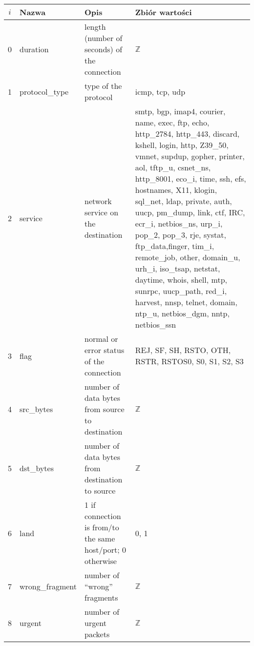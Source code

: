 \documentclass[a4paper, 12pt]{article}
\begin{document}
\begin{tabular}{ | c | p{3cm} | p{3cm} | p{6cm} | } \hline
$i$ & Nazwa & Opis & Zbiór wartości \\ \hline
0      & duration & length (number of seconds) of the connection & $\mathbb{Z}$ \\ \hline
1      & protocol\_type & type of the protocol & icmp, tcp, udp \\ \hline
2      & service & network service on the destination & smtp, bgp, imap4, courier, name, exec, ftp, echo, http\_2784,
                       http\_443, discard, kshell, login, http, Z39\_50, vmnet, supdup,
                       gopher, printer, aol, tftp\_u, csnet\_ns, http\_8001, eco\_i, time,
                       ssh, efs, hostnames, X11, klogin, sql\_net, ldap, private,
                       auth, uucp, pm\_dump, link, ctf, IRC, ecr\_i, netbios\_ns, urp\_i,
                       pop\_2, pop\_3, rje, systat, ftp\_data,finger, tim\_i, remote\_job,
                       other, domain\_u, urh\_i, iso\_tsap, netstat, daytime, whois, shell,
                       mtp, sunrpc, uucp\_path, red\_i, harvest, nnsp, telnet, domain,
                       ntp\_u, netbios\_dgm, nntp, netbios\_ssn \\ \hline
3      & flag & normal or error status of the connection  & REJ, SF, SH, RSTO, OTH, RSTR, RSTOS0, S0, S1, S2, S3 \\ \hline
4      & src\_bytes  & number of data bytes from source to destination  & $\mathbb{Z}$ \\ \hline
5      & dst\_bytes  & number of data bytes from destination to source  & $\mathbb{Z}$ \\ \hline
6      & land & 1 if connection is from/to the same host/port; 0 otherwise  & 0, 1 \\ \hline
7      & wrong\_fragment  & number of ``wrong'' fragments  & $\mathbb{Z}$ \\ \hline
8      & urgent  & number of urgent packets   & $\mathbb{Z}$ \\ \hline
\end{tabular}
\end{document}
